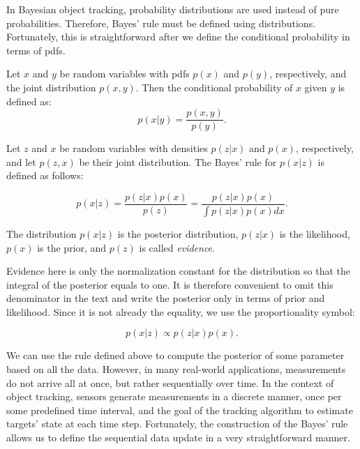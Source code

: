 In Bayesian object tracking, probability distributions are used instead of pure 
probabilities. Therefore, Bayes' rule must be defined using distributions. 
Fortunately, this is straightforward after we define the conditional probability in terms of pdfs.

\begin{definition}\label{def:cond-prob-pdf}
    Let $x$ and $y$ be random variables with pdfs $p(x)$ and $p(y)$, respectively, and the joint distribution $p(x,y)$. Then the conditional probability of $x$ given $y$ is defined as:
    \begin{equation*}
        p(x|y) = \frac{p(x,y)}{p(y)}.
    \end{equation*}
\end{definition}

\begin{definition}
    Let $z$ and $x$ be random variables with densities $p(z | x)$ and $p(x)$, 
    respectively, and let $p(z, x)$ be their joint distribution. The Bayes' rule
    for 
    $p(x | z)$ is defined as follows:

    $$
    p(x | z)
        = \frac{p(z | x) p(x)}{p(z)}
        = \frac{p(z | x) p(x)}{\int p(z | x) p(x) dx}.
    $$
\end{definition}

The distribution $p(x | z)$ is the posterior distribution, $p(z | x)$ is the 
likelihood, $p(x)$ is the prior, and $p(z)$ is called \textit{evidence}.

Evidence here is only the normalization constant for the distribution so
that the integral of the posterior equals to one. It is therefore convenient
to omit this denominator in the text and write the posterior only in terms of
prior and likelihood. Since it is not already the equality, we use the
proportionality symbol:

$$
p(x | z) \propto p(z | x) p(x).
$$

We can use the rule defined above to compute the posterior of some parameter
based on all the data. However, in many real-world applications, measurements
do not arrive all at once, but rather sequentially over time. In the context of 
object tracking, sensors generate measurements in a discrete manner, once per
some predefined time interval, and the goal of the tracking algorithm to 
estimate targets' state at each time step. Fortunately, the construction of the
Bayes' rule allows us to define the sequential data update in a very 
straightforward manner.

